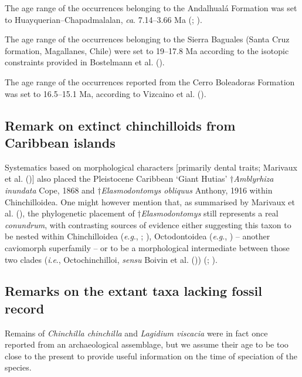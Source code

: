 \documentclass[
  9pt,
  letterpaper,
]{article}
\begin{document}
The age range of the occurrences belonging to the Andalhualá Formation
was set to Huayquerian--Chapadmalalan, \emph{ca}. 7.14--3.66 Ma
(;
).

The age range of the occurrences belonging to the Sierra Baguales (Santa
Cruz formation, Magallanes, Chile) were set to 19--17.8 Ma according to
the isotopic constraints provided in Bostelmann et al.
().

The age range of the occurrences reported from the Cerro Boleadoras
Formation was set to 16.5--15.1 Ma, according to Vizcaino et al.
().

\subsection{Remark on extinct chinchilloids from Caribbean
islands}\label{remark-on-extinct-chinchilloids-from-caribbean-islands}

Systematics based on morphological characters {[}primarily dental
traits; Marivaux et al. (){]}
also placed the Pleistocene Caribbean `Giant Hutias'
\(\dagger\)\emph{Amblyrhiza inundata} Cope, 1868 and
\(\dagger\)\emph{Elasmodontomys obliquus} Anthony, 1916 within
Chinchilloidea. One might however mention that, as summarised by
Marivaux et al. (), the phylogenetic
placement of \(\dagger\)\emph{Elasmodontomys} still represents a real
\emph{conundrum}, with contrasting sources of evidence either suggesting
this taxon to be nested within Chinchilloidea (\emph{e}.\emph{g}.,
;
), Octodontoidea (\emph{e}.\emph{g}.,
) -- another caviomorph
superfamily -- or to be a morphological intermediate between those two
clades (\emph{i}.\emph{e}., Octochinchilloi, \emph{sensu} Boivin et al.
()) (; ).

\subsection{Remarks on the extant taxa lacking fossil
record}\label{remarks-on-the-extant-taxa-lacking-fossil-record}

Remains of \emph{Chinchilla chinchilla} and \emph{Lagidium viscacia}
were in fact once reported from an archaeological assemblage, but we
assume their age to be too close to the present to provide useful
information on the time of speciation of the species.
\end{document}
